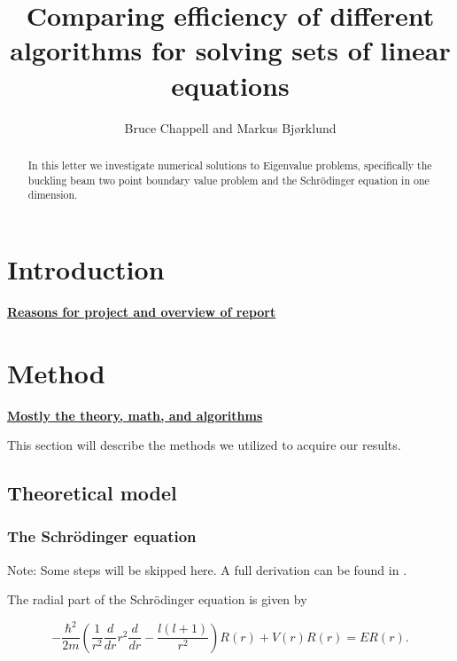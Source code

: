 \documentclass{emulateapj}
\begin{document}
\title{Comparing efficiency of different algorithms for solving sets of linear equations}

\author{Bruce Chappell and Markus Bjørklund}



\begin{abstract}
In this letter we investigate numerical solutions to Eigenvalue problems, specifically the buckling beam two point boundary value problem and the Schrödinger equation in one dimension.

\end{abstract}

\section{Introduction}
\label{sec:introduction}
\underline{\textbf{Reasons for project and overview of report}}

\section{Method}
\label{sec:method}
\underline{\textbf{Mostly the theory, math, and algorithms}}

This section will describe the methods we utilized to acquire our results.

\subsection{Theoretical model}

\subsubsection{The Schrödinger equation}

Note: Some steps will be skipped here. A full derivation can be found in \cite{Project}.

The radial part of the Schrödinger equation is given by

\begin{equation}
  -\frac{\hbar^2}{2 m} \left ( \frac{1}{r^2} \frac{d}{dr} r^2
  \frac{d}{dr} - \frac{l (l + 1)}{r^2} \right )R(r)
     + V(r) R(r) = E R(r).
\end{equation}
\end{document}
